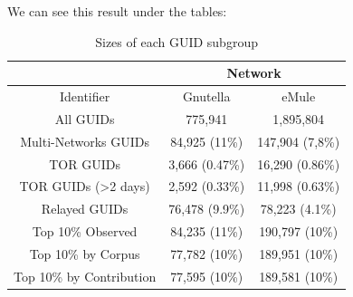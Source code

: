 \documentclass[notes]{beamer}
\begin{document}
\begin{frame}
\begin{block}{We can see this result under the tables:}

\begin{table}[H]
\centering

\caption{Sizes of each GUID subgroup} 
\label{tab:table2}
\begin{tabular}{ccc}\hline & \multicolumn{2}{c}{Network} \\

\hline 

Identifier & Gnutella & eMule \\ 

\hline
\hline
All GUIDs & 775,941 & 1,895,804 \\
Multi-Networks GUIDs & 84,925 (11\%) & 147,904 (7,8\%) \\
TOR GUIDs & 3,666 (0.47\%) & 16,290 (0.86\%) \\
TOR GUIDs (>2 days) & 2,592 (0.33\%) & 11,998 (0.63\%) \\
Relayed GUIDs & 76,478 (9.9\%) & 78,223 (4.1\%) \\
Top 10\% Observed & 84,235 (11\%) & 190,797 (10\%) \\
Top 10\% by Corpus & 77,782 (10\%) & 189,951 (10\%) \\
Top 10\% by Contribution & 77,595 (10\%) & 189,581 (10\%)\\

\hline
\end{tabular}

\end{table} 

\end{block}

\end{frame}
\end{document}

